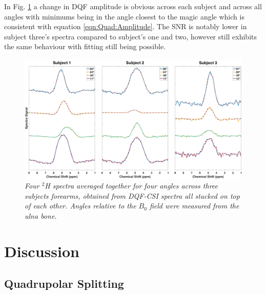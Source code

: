In Fig. \ref{fig:Quad:DQF_CSI_Angle} a change in \ac{DQF} amplitude is obvious across each subject and across all angles with minimums being in the angle closest to the magic angle which is consistent with equation \ref{eqn:Quad:Amplitude}. The \ac{SNR} is notably lower in subject three's spectra compared to subject's one and two, however still exhibits the same behaviour with fitting still being possible.

\begin{figure}
    \centering
    \includegraphics[width=1\textwidth]{Figures/Quad/DQF_CSI_Angle.png}
    \caption{\textit{Four $^2$H spectra averaged together for four angles across three subjects forearms, obtained from \ac{DQF}-\ac{CSI} spectra all stacked on top of each other. Angles relative to the $B_0$ field were measured from the ulna bone.}}
    \label{fig:Quad:DQF_CSI_Angle}
\end{figure}

\section{Discussion}

\subsection{Quadrupolar Splitting}

